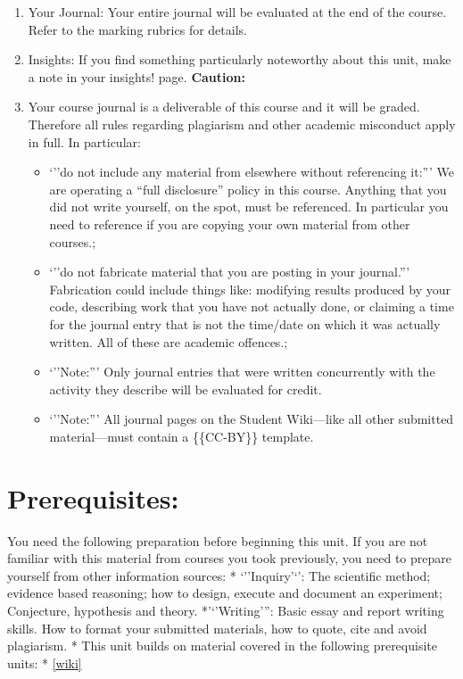 \documentclass[]{book}
\providecommand{\tightlist}{%
  \setlength{\itemsep}{0pt}\setlength{\parskip}{0pt}}
\begin{document}
\begin{enumerate}
\def\labelenumi{\arabic{enumi}.}
\tightlist
\item
  Your Journal: Your entire journal will be evaluated at the end of the
  course. Refer to the marking rubrics for details.
\item
  Insights: If you find something particularly noteworthy about this
  unit, make a note in your insights! page. \textbf{Caution:}
\item
  Your course journal is a deliverable of this course and it will be
  graded. Therefore all rules regarding plagiarism and other academic
  misconduct apply in full. In particular:

  \begin{itemize}
  \tightlist
  \item
    `''do not include any material from elsewhere without referencing
    it:''' We are operating a ``full disclosure'' policy in this course.
    Anything that you did not write yourself, on the spot, must be
    referenced. In particular you need to reference if you are copying
    your own material from other courses.;
  \item
    `''do not fabricate material that you are posting in your
    journal.''' Fabrication could include things like: modifying results
    produced by your code, describing work that you have not actually
    done, or claiming a time for the journal entry that is not the
    time/date on which it was actually written. All of these are
    academic offences.;
  \item
    `''Note:''' Only journal entries that were written concurrently with
    the activity they describe will be evaluated for credit.
  \item
    `''Note:''' All journal pages on the Student Wiki---like all other
    submitted material---must contain a \{\{CC-BY\}\} template.
  \end{itemize}
\end{enumerate}

\section{Prerequisites:}\label{prerequisites}

You need the following preparation before beginning this unit. If you
are not familiar with this material from courses you took previously,
you need to prepare yourself from other information sources: *
`''Inquiry'`': The scientific method; evidence based reasoning; how to
design, execute and document an experiment; Conjecture, hypothesis and
theory. *'`'Writing''': Basic essay and report writing skills. How to
format your submitted materials, how to quote, cite and avoid
plagiarism. * This unit builds on material covered in the following
prerequisite units: * \ref{wiki}
\end{document}
